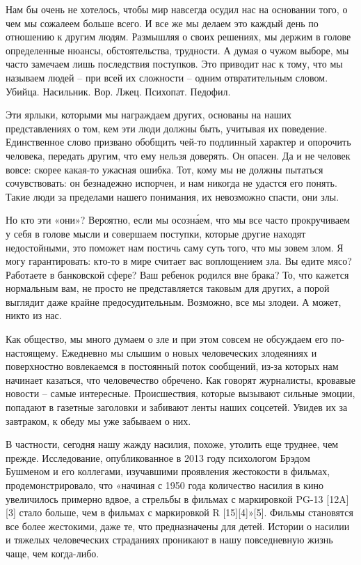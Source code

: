 Нам бы очень не хотелось, чтобы мир навсегда осудил нас на основании того, о чем мы сожалеем больше всего. И все же мы делаем это каждый день по отношению к другим людям. Размышляя о своих решениях, мы держим в голове определенные нюансы, обстоятельства, трудности. А думая о чужом выборе, мы часто замечаем лишь последствия поступков. Это приводит нас к тому, что мы называем людей – при всей их сложности – одним отвратительным словом. Убийца. Насильник. Вор. Лжец. Психопат. Педофил.
	
	

Эти ярлыки, которыми мы награждаем других, основаны на наших представлениях о том, кем эти люди должны быть, учитывая их поведение. Единственное слово призвано обобщить чей-то подлинный характер и опорочить человека, передать другим, что ему нельзя доверять. Он опасен. Да и не человек вовсе: скорее какая-то ужасная ошибка. Тот, кому мы не должны пытаться сочувствовать: он безнадежно испорчен, и нам никогда не удастся его понять. Такие люди за пределами нашего понимания, их невозможно спасти, они злы.

Но кто эти «они»? Вероятно, если мы осозна́ем, что мы все часто прокручиваем у себя в голове мысли и совершаем поступки, которые другие находят недостойными, это поможет нам постичь саму суть того, что мы зовем злом. Я могу гарантировать: кто-то в мире считает вас воплощением зла. Вы едите мясо? Работаете в банковской сфере? Ваш ребенок родился вне брака? То, что кажется нормальным вам, не просто не представляется таковым для других, а порой выглядит даже крайне предосудительным. Возможно, все мы злодеи. А может, никто из нас.

Как общество, мы много думаем о зле и при этом совсем не обсуждаем его по-настоящему. Ежедневно мы слышим о новых человеческих злодеяниях и поверхностно вовлекаемся в постоянный поток сообщений, из-за которых нам начинает казаться, что человечество обречено. Как говорят журналисты, кровавые новости – самые интересные. Происшествия, которые вызывают сильные эмоции, попадают в газетные заголовки и забивают ленты наших соцсетей. Увидев их за завтраком, к обеду мы уже забываем о них.

В частности, сегодня нашу жажду насилия, похоже, утолить еще труднее, чем прежде. Исследование, опубликованное в 2013 году психологом Брэдом Бушменом и его коллегами, изучавшими проявления жестокости в фильмах, продемонстрировало, что «начиная с 1950 года количество насилия в кино увеличилось примерно вдвое, а стрельбы в фильмах с маркировкой PG-13 [12A][3] стало больше, чем в фильмах с маркировкой R [15][4]»[5]. Фильмы становятся все более жестокими, даже те, что предназначены для детей. Истории о насилии и тяжелых человеческих страданиях проникают в нашу повседневную жизнь чаще, чем когда-либо.

